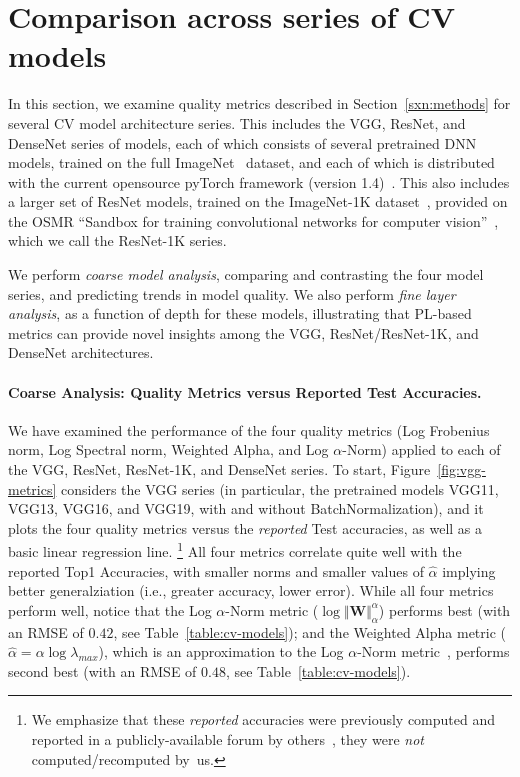 \section{Comparison across series of CV models}
\label{sxn:cv}

In this section, we examine quality metrics described in Section~\ref{sxn:methods} for several CV model architecture series.
This includes the VGG, ResNet, and DenseNet series of models, each of which consists of several pretrained DNN models, trained on the full ImageNet~\cite{imagenet} dataset, and each of which is distributed with the current opensource pyTorch framework (version 1.4)~\cite{pyTorch}.
This also includes a larger set of ResNet models, trained on the ImageNet-1K dataset~\cite{imagenet1k}, provided on the OSMR ``Sandbox for training convolutional networks for computer vision''~\cite{osmr}, which we call the ResNet-1K series.

We perform \emph{coarse model analysis}, comparing and contrasting the four model series, and predicting trends in model quality. 
We also perform \emph{fine layer analysis}, as a function of depth for these models, illustrating that PL-based metrics can provide novel insights among the VGG, ResNet/ResNet-1K, and DenseNet architectures. 

\paragraph{Coarse Analysis: Quality Metrics versus Reported Test Accuracies.}

We have examined the performance of the four quality metrics (Log Frobenius norm, Log Spectral norm, Weighted Alpha, and Log $\alpha$-Norm) applied to each of the VGG, ResNet, ResNet-1K, and DenseNet series.
To start, Figure~\ref{fig:vgg-metrics} considers the VGG series (in particular, the pretrained models VGG11, VGG13, VGG16, and VGG19, with and without BatchNormalization), and it plots the four quality metrics versus the \emph{reported} Test accuracies, as well as a basic linear regression line.%
\footnote{We emphasize that these \emph{reported} accuracies were previously computed and reported in a publicly-available forum by others~\cite{pyTorchVgg}, they were \emph{not} computed/recomputed by~us.}
All four metrics correlate quite well with the reported Top1 Accuracies, with smaller norms and smaller values of $\hat{\alpha}$ implying better generalziation (i.e., greater accuracy, lower error). 
While all four metrics perform well, notice that the Log $\alpha$-Norm metric ($\log\Vert\mathbf{W}\Vert_{\alpha}^{\alpha}$) performs best (with an RMSE of $0.42$, see Table~\ref{table:cv-models}); and the Weighted Alpha metric ($\hat\alpha =\alpha\log\lambda_{max} $), which is an approximation to the Log $\alpha$-Norm metric~\cite{MM20_unpub_work}, performs second best (with an RMSE of $0.48$, see Table~\ref{table:cv-models}).


